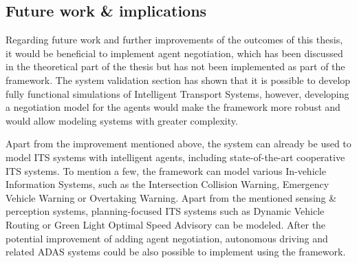 \documentclass[main.tex]{subfiles}
\begin{document}
\subsection{Future work \& implications}

Regarding future work and further improvements of the outcomes of this thesis, it would be
beneficial to implement agent negotiation, which has been discussed in the theoretical part of
the thesis but has not been implemented as part of the framework. The system validation section
has shown that it is possible to develop fully functional simulations of Intelligent Transport
Systems, however, developing a negotiation model for the agents would make the framework more
robust and would allow modeling systems with greater complexity.

Apart from the improvement mentioned above, the system can already be used to model ITS systems
with intelligent agents, including state-of-the-art cooperative ITS systems. To mention a few,
the framework can model various In-vehicle Information Systems, such as the Intersection
Collision Warning, Emergency Vehicle Warning or Overtaking Warning.  Apart from the mentioned
sensing \& perception systems, planning-focused ITS systems such as Dynamic Vehicle Routing or
Green Light Optimal Speed Advisory can be modeled. After the potential improvement of adding
agent negotiation, autonomous driving and related ADAS systems could be also possible to
implement using the framework.
\end{document}
